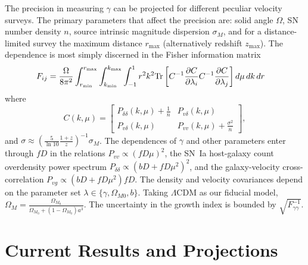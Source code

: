 \documentclass[11pt, oneside]{article}   	%
\begin{document}
The precision  in measuring $\gamma$ can be projected for different peculiar velocity surveys.
The primary  parameters that affect the precision are: solid angle $\Omega$, SN number density $n$, source intrinsic
magnitude dispersion $\sigma_M$, and for a distance-limited survey the maximum distance $r_{\text{max}}$ (alternatively redshift $z_{\text{max}}$).
The dependence is most simply discerned 
in the  Fisher information matrix
\begin{align}
F_{ij} 
& = \frac{\Omega}{8\pi^2} \int_{r_{\rm min}}^{r_{\rm max}}  \int_{k_{\rm min}}^{k_{\rm max}}  \int_{-1}^{1} r^2 k^2 \text{Tr}\left[ C^{-1} \frac{\partial C}{\partial \lambda_i} C^{-1}
\frac{\partial C}{\partial \lambda_j} \right] d\mu\,dk\,dr
\label{fisher:eqn}
\end{align}
where
\begin{equation}
C(k,\mu)  =
  \begin{bmatrix}
   P_{\delta \delta}(k,\mu) + \frac{1}{n} &
   P_{v\delta}(k,\mu)  \\
   P_{v\delta}(k,\mu)  &
  P_{vv}(k,\mu) + \frac{\sigma^2}{n}
   \end{bmatrix},
\label{cov:eq}
\end{equation}
and $\sigma \approx (\frac{5}{\ln{10}} \frac{1+z}{z})^{-1} \sigma_M$.
The dependences of $\gamma$ and other parameters enter through $fD$ in the relations $P_{vv}\propto (fD\mu)^2$, the SN~Ia host-galaxy count overdensity
power spectrum $P_{\delta \delta }\propto (bD + fD\mu^2)^2$, and the galaxy-velocity cross-correlation $P_{vg}
\propto  (bD + fD\mu^2)fD$.  
 The density and velocity covariances depend on the parameter set $\lambda \in \{\gamma, \Omega_{M0}, b\}$.
Taking $\Lambda$CDM as our fiducial model, 
$\Omega_M=\frac{\Omega_{M_0}}{\Omega_{M_0} + (1-\Omega_{M_0})a^3}$.  
The uncertainty in the growth index is bounded by $\sqrt{F^{-1}_{\gamma \gamma}}$.

\section{Current Results and Projections}
\end{document}
